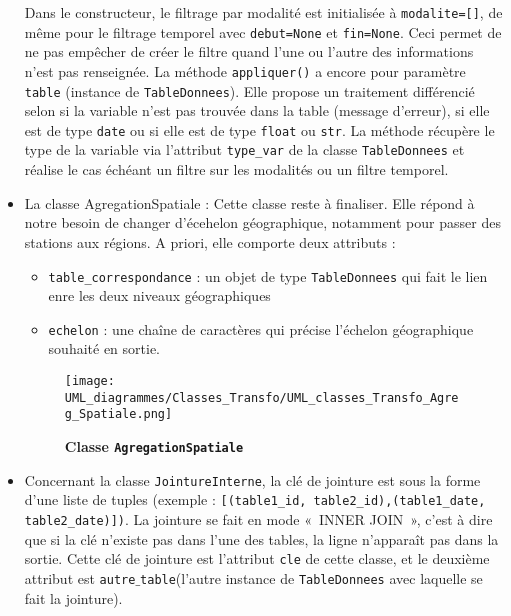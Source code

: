 \documentclass[11pt]{article}
\begin{document}
\begin{itemize}
    Dans le constructeur, le filtrage par modalité est initialisée à \texttt{modalite=[]}, de même pour le filtrage temporel avec \texttt{debut=None} et \texttt{fin=None}. Ceci permet de ne pas empêcher de créer le filtre quand l'une ou l'autre des informations n'est pas renseignée. La méthode \texttt{appliquer()} a encore pour paramètre \texttt{table} (instance de \texttt{TableDonnees}). Elle propose un traitement différencié selon si la variable n'est pas trouvée dans la table (message d'erreur), si elle est de type \texttt{date} ou si elle est de type \texttt{float} ou \texttt{str}. La méthode récupère le type de la variable via l'attribut \texttt{type\_var} de la classe \texttt{TableDonnees} et réalise le cas échéant un filtre sur les modalités ou un filtre temporel. 
    
    \item La classe AgregationSpatiale : Cette classe reste à finaliser. Elle répond à notre besoin de changer d'écehelon géographique, notamment pour passer des stations aux régions. A priori, elle comporte deux attributs : 
        \begin{itemize}[label=, font=\small]
            \item \texttt{table\_correspondance} : un objet de type \texttt{TableDonnees} qui fait le lien enre les deux niveaux géographiques
            \item \texttt{echelon} : une chaîne de caractères qui précise l'échelon géographique souhaité en sortie.
        \end{itemize}

    \begin{figure}[H]
    \caption{\textbf{Classe \texttt{AgregationSpatiale}}}
    \label{UML_classe_agreg_spat}
    \centering
    \texttt{[image: UML\_diagrammes/Classes\_Transfo/UML\_classes\_Transfo\_Agreg\_Spatiale.png]}
    \end{figure}
    
    \item Concernant la classe \texttt{JointureInterne}, la clé de jointure est sous la forme d'une liste de tuples (exemple : \texttt{[(table1\_id, table2\_id),(table1\_date, table2\_date)])}. La jointure se fait en mode «~INNER JOIN~», c'est à dire que si la clé n'existe pas dans l'une des tables, la ligne n'apparaît pas dans la sortie. Cette clé de jointure est l'attribut \texttt{cle} de cette classe, et le deuxième attribut est \texttt{autre$\_$table}(l'autre instance de \texttt{TableDonnees} avec laquelle se fait la jointure). %
    

\end{itemize}
\end{document}
